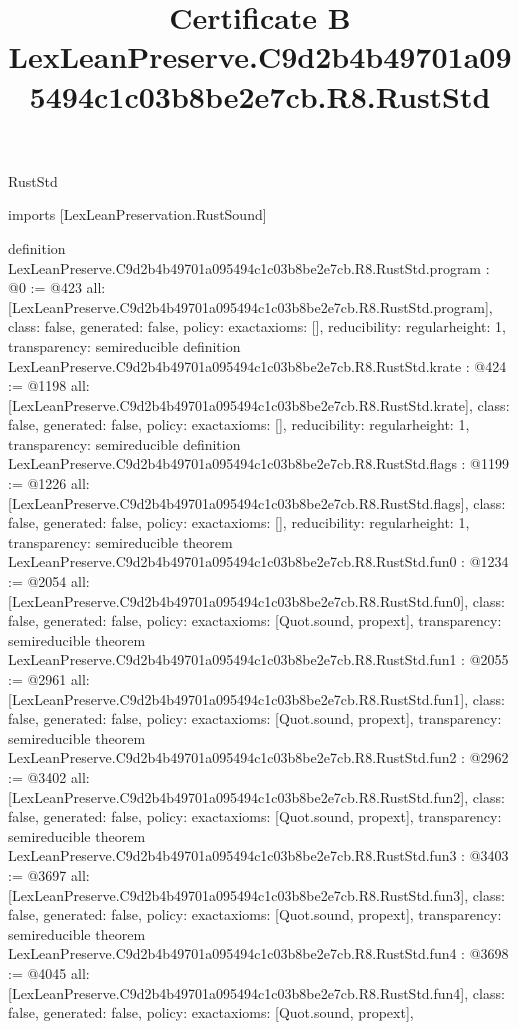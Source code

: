 \begin{lexlean}{RustStd}
\title{Certificate B LexLeanPreserve.C9d2b4b49701a095494c1c03b8be2e7cb.R8.RustStd}
\begin{coremodule}
imports [LexLeanPreservation.RustSound]

definition LexLeanPreserve.C9d2b4b49701a095494c1c03b8be2e7cb.R8.RustStd.program : @0 := @423 {
  all: [LexLeanPreserve.C9d2b4b49701a095494c1c03b8be2e7cb.R8.RustStd.program],
  class: false,
  generated: false,
  policy: exact{axioms: []},
  reducibility: regular{height: 1},
  transparency: semireducible
}
definition LexLeanPreserve.C9d2b4b49701a095494c1c03b8be2e7cb.R8.RustStd.krate : @424 := @1198 {
  all: [LexLeanPreserve.C9d2b4b49701a095494c1c03b8be2e7cb.R8.RustStd.krate],
  class: false,
  generated: false,
  policy: exact{axioms: []},
  reducibility: regular{height: 1},
  transparency: semireducible
}
definition LexLeanPreserve.C9d2b4b49701a095494c1c03b8be2e7cb.R8.RustStd.flags : @1199 := @1226 {
  all: [LexLeanPreserve.C9d2b4b49701a095494c1c03b8be2e7cb.R8.RustStd.flags],
  class: false,
  generated: false,
  policy: exact{axioms: []},
  reducibility: regular{height: 1},
  transparency: semireducible
}
theorem LexLeanPreserve.C9d2b4b49701a095494c1c03b8be2e7cb.R8.RustStd.fun0 : @1234 := @2054 {
  all: [LexLeanPreserve.C9d2b4b49701a095494c1c03b8be2e7cb.R8.RustStd.fun0],
  class: false,
  generated: false,
  policy: exact{axioms: [Quot.sound, propext]},
  transparency: semireducible
}
theorem LexLeanPreserve.C9d2b4b49701a095494c1c03b8be2e7cb.R8.RustStd.fun1 : @2055 := @2961 {
  all: [LexLeanPreserve.C9d2b4b49701a095494c1c03b8be2e7cb.R8.RustStd.fun1],
  class: false,
  generated: false,
  policy: exact{axioms: [Quot.sound, propext]},
  transparency: semireducible
}
theorem LexLeanPreserve.C9d2b4b49701a095494c1c03b8be2e7cb.R8.RustStd.fun2 : @2962 := @3402 {
  all: [LexLeanPreserve.C9d2b4b49701a095494c1c03b8be2e7cb.R8.RustStd.fun2],
  class: false,
  generated: false,
  policy: exact{axioms: [Quot.sound, propext]},
  transparency: semireducible
}
theorem LexLeanPreserve.C9d2b4b49701a095494c1c03b8be2e7cb.R8.RustStd.fun3 : @3403 := @3697 {
  all: [LexLeanPreserve.C9d2b4b49701a095494c1c03b8be2e7cb.R8.RustStd.fun3],
  class: false,
  generated: false,
  policy: exact{axioms: [Quot.sound, propext]},
  transparency: semireducible
}
theorem LexLeanPreserve.C9d2b4b49701a095494c1c03b8be2e7cb.R8.RustStd.fun4 : @3698 := @4045 {
  all: [LexLeanPreserve.C9d2b4b49701a095494c1c03b8be2e7cb.R8.RustStd.fun4],
  class: false,
  generated: false,
  policy: exact{axioms: [Quot.sound, propext]},
}
\end{coremodule}
\end{lexlean}
